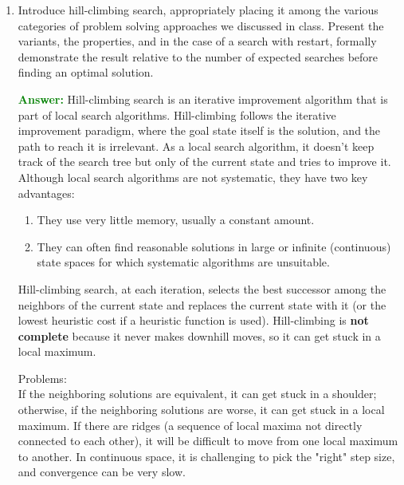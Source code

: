 \documentclass[12pt]{article}
\begin{document}
\begin{enumerate}[label=\textbf{II.\arabic*}]
    \item\label{q-hillclimbing}
          Introduce hill-climbing search, appropriately placing it among the various categories of problem solving approaches we discussed in class.
          Present the variants, the properties, and in the case of a search with restart, formally demonstrate the result relative to the number of expected searches before finding an optimal solution.

          \textcolor{green}{\textbf{Answer:}}
          Hill-climbing search is an iterative improvement algorithm that is part of local search algorithms. Hill-climbing follows the iterative improvement paradigm, where the goal state itself is the solution, and the path to reach it is irrelevant. As a local search algorithm, it doesn't keep track of the search tree but only of the current state and tries to improve it. Although local search algorithms are not systematic, they have two key advantages:
          \begin{enumerate}
              \item They use very little memory, usually a constant amount.
              \item They can often find reasonable solutions in large or infinite (continuous) state spaces for which systematic algorithms are unsuitable.
          \end{enumerate}

          Hill-climbing search, at each iteration, selects the best successor among the neighbors of the current state and replaces the current state with it (or the lowest heuristic cost if a heuristic function is used). Hill-climbing is \textbf{not complete} because it never makes downhill moves, so it can get stuck in a local maximum.

          Problems:\\
          If the neighboring solutions are equivalent, it can get stuck in a shoulder; otherwise, if the neighboring solutions are worse, it can get stuck in a local maximum. If there are ridges (a sequence of local maxima not directly connected to each other), it will be difficult to move from one local maximum to another. In continuous space, it is challenging to pick the "right" step size, and convergence can be very slow.


\end{enumerate}
\end{document}
